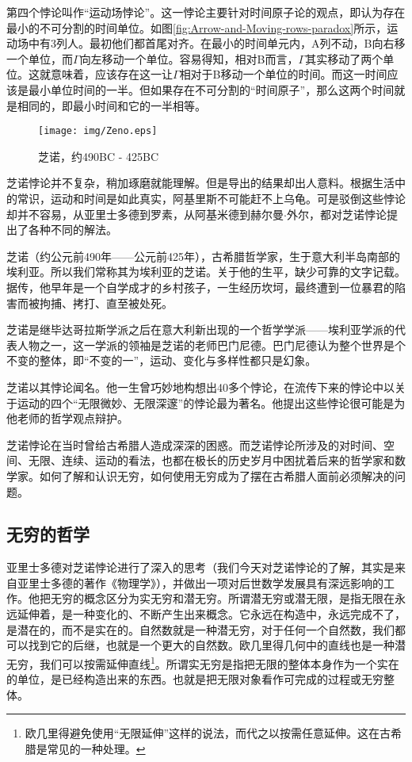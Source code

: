 \documentclass{article}
\begin{document}
第四个悖论叫作“运动场悖论”。这一悖论主要针对时间原子论的观点，即认为存在最小的不可分割的时间单位。如图\ref{fig:Arrow-and-Moving-rows-paradox}所示，运动场中有3列人。最初他们都首尾对齐。在最小的时间单元内，A列不动，B向右移一个单位，而$\Gamma$向左移动一个单位。容易得知，相对B而言，$\Gamma$其实移动了两个单位。这就意味着，应该存在这一让$\Gamma$相对于B移动一个单位的时间。而这一时间应该是最小单位时间的一半。但如果存在不可分割的“时间原子”，那么这两个时间就是相同的，即最小时间和它的一半相等。

\begin{wrapfigure}{L}{0.3\textwidth}
 \centering
 \texttt{[image: img/Zeno.eps]}
 \captionsetup{labelformat=empty}
 \caption{芝诺，约490BC - 425BC}
 \label{fig:Zeno-of-Elea}
\end{wrapfigure}

芝诺悖论并不复杂，稍加琢磨就能理解。但是导出的结果却出人意料。根据生活中的常识，运动和时间是如此真实，阿基里斯不可能赶不上乌龟。可是驳倒这些悖论却并不容易，从亚里士多德到罗素，从阿基米德到赫尔曼$\cdot$外尔，都对芝诺悖论提出了各种不同的解法\cite{Wikipedia-Zeno}。

芝诺（约公元前490年——公元前425年），古希腊哲学家，生于意大利半岛南部的埃利亚。所以我们常称其为埃利亚的芝诺。关于他的生平，缺少可靠的文字记载。据传，他早年是一个自学成才的乡村孩子，一生经历坎坷，最终遭到一位暴君的陷害而被拘捕、拷打、直至被处死\cite{HanXueTao16}。

芝诺是继毕达哥拉斯学派之后在意大利新出现的一个哲学学派——埃利亚学派的代表人物之一，这一学派的领袖是芝诺的老师巴门尼德。巴门尼德认为整个世界是个不变的整体，即“不变的一”，运动、变化与多样性都只是幻象。

芝诺以其悖论闻名。他一生曾巧妙地构想出40多个悖论，在流传下来的悖论中以关于运动的四个“无限微妙、无限深邃”的悖论最为著名。他提出这些悖论很可能是为他老师的哲学观点辩护。

芝诺悖论在当时曾给古希腊人造成深深的困惑。而芝诺悖论所涉及的对时间、空间、无限、连续、运动的看法，也都在极长的历史岁月中困扰着后来的哲学家和数学家。如何了解和认识无穷，如何使用无穷成为了摆在古希腊人面前必须解决的问题。

\subsection{无穷的哲学}
 
亚里士多德对芝诺悖论进行了深入的思考（我们今天对芝诺悖论的了解，其实是来自亚里士多德的著作《物理学》），并做出一项对后世数学发展具有深远影响的工作。他把无穷的概念区分为实无穷和潜无穷。所谓潜无穷或潜无限，是指无限在永远延伸着，是一种变化的、不断产生出来概念。它永远在构造中，永远完成不了，是潜在的，而不是实在的。自然数就是一种潜无穷，对于任何一个自然数，我们都可以找到它的后继，也就是一个更大的自然数。欧几里得几何中的直线也是一种潜无穷，我们可以按需延伸直线\footnote{欧几里得避免使用“无限延伸”这样的说法，而代之以按需任意延伸。这在古希腊是常见的一种处理。}。所谓实无穷是指把无限的整体本身作为一个实在的单位，是已经构造出来的东西。也就是把无限对象看作可完成的过程或无穷整体。
\end{document}
